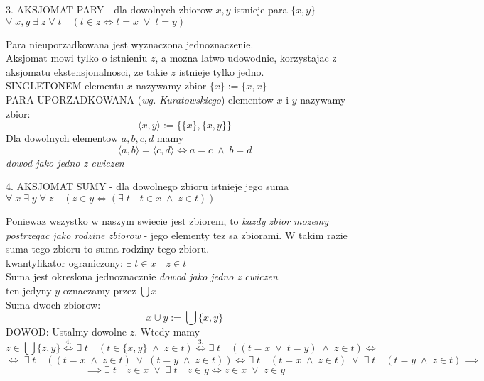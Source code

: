 \documentclass{article}
\begin{document}
  \begin{center}
    \color{tit}3. AKSJOMAT PARY \color{txt}- dla dowolnych zbiorow $x, y$ istnieje para $\{x,y\}$\smallskip\\
    $\forall\;x,y\;\exists\;z\;\forall\;t\quad(t\in z\iff t = x \;\lor\; t=y)$
  \end{center}
  \color{acc}Para nieuporzadkowana jest wyznaczona jednoznaczenie.\color{txt}\smallskip\\
  Aksjomat mowi tylko o istnieniu $z$, a mozna latwo udowodnic, korzystajac z aksjomatu ekstensjonalnosci, ze takie $z$ istnieje tylko jedno.\medskip\\
  \color{def}SINGLETONEM \color{txt}elementu $x$ nazywamy zbior $\{x\}:=\{x,x\}$\medskip\\
  \color{def}PARA UPORZADKOWANA \color{txt}(\emph{wg. Kuratowskiego}) elementow $x$ i $y$ nazywamy zbior:
  $$\langle x,y\rangle:=\{\{x\},\{x,y\}\}$$
  Dla dowolnych elementow $a,b,c,d$ mamy
  $$\langle a,b\rangle = \langle c,d\rangle \iff a=c\;\land\; b=d$$
  \emph{\color{emp}dowod jako jedno z cwiczen}\bigskip
  \begin{center}
    \color{tit}4. AKSJOMAT SUMY \color{txt}- dla dowolnego zbioru istnieje jego suma\smallskip\\
    $\forall\;x\;\exists\;y\;\forall\;z\quad (z\in y\iff(\exists\;t\quad t\in x\;\land\;z\in t))$
  \end{center}
  Poniewaz wszystko w naszym swiecie jest zbiorem, to \color{emp}\emph{kazdy zbior mozemy postrzegac jako rodzine zbiorow} \color{txt}- jego elementy tez sa zbiorami. W takim razie suma tego zbioru to suma rodziny tego zbioru.\medskip\\
  \color{acc}kwantyfikator ograniczony: \color{txt}$\exists\;t\in x\quad z\in t$\medskip\\
  Suma jest okreslona jednoznacznie \color{emp}\emph{dowod jako jedno z cwiczen}\color{txt}\\
  \color{def}ten jedyny $y$ oznaczamy przez $\bigcup x$\color{txt}\bigskip\\
  \color{acc}Suma dwoch zbiorow\color{txt}:
  $$x\cup y:=\bigcup\{x,y\}$$
  \color{acc}DOWOD\color{txt}: Ustalmy dowolne $z$. Wtedy mamy 
  $$z\in \bigcup\{z,y\}\overset{4.}{\iff}\exists\;t\quad(t\in\{x,y\}\;\land\;z\in t)\overset{3.}{\iff}\exists\;t\quad((t=x\;\lor\;t=y)\;\land\;z\in t)\iff$$
  $$\iff\;\exists\;t\quad((t=x\;\land\;z\in t)\;\lor\;(t=y\;\land\;z\in t))\iff\exists\;t\quad(t=x\;\land\;z\in t)\;\lor\;\exists\;t\quad(t=y\;\land\;z\in t)\implies$$
  $$\implies\exists\;t\quad z\in x\;\lor\;\exists\;t\quad z\in y\iff z\in x\;\lor\; z\in y$$
\end{document}
